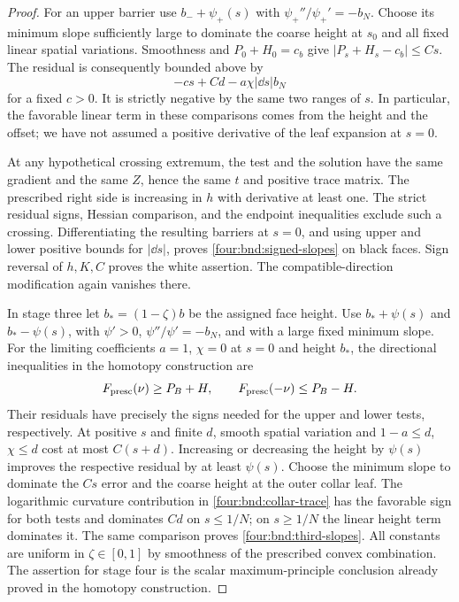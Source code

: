 \begin{proof}
For an upper barrier use $b_-+\psi_+(s)$ with
$\psi_+''/\psi_+'=-b_N$.  Choose its minimum slope sufficiently
large to dominate the coarse height at $s_0$ and all fixed linear
spatial variations.  Smoothness and $P_0+H_0=c_b$ give
$|P_s+H_s-c_b|\le Cs$.  The residual is consequently bounded above
by
\begin{equation}\label{four:bnd:upper-residual}
 -c s+Cd-a\chi|\dd s|b_N
\end{equation}
for a fixed $c>0$.  It is strictly negative by the same two ranges
of $s$.  In particular, the favorable linear term in these
comparisons comes from the height and the offset; we have not
assumed a positive derivative of the leaf expansion at $s=0$.

At any hypothetical crossing extremum, the test and the solution
have the same gradient and the same $Z$, hence the same $t$ and
positive trace matrix.  The prescribed right side is increasing
in $h$ with derivative at least one.  The strict residual signs,
Hessian comparison, and the endpoint inequalities exclude such
a crossing.  Differentiating the resulting barriers at $s=0$,
and using upper and lower positive bounds for $|\dd s|$, proves
\eqref{four:bnd:signed-slopes} on black faces.  Sign reversal of
$h,K,C$ proves the white assertion.  The compatible-direction
modification again vanishes there.

In stage three let $b_*=(1-\zeta)b$ be the assigned face height.
Use $b_*+\psi(s)$ and $b_*-\psi(s)$, with $\psi'>0$,
$\psi''/\psi'=-b_N$, and with a large fixed minimum slope.
For the limiting coefficients $a=1$, $\chi=0$ at $s=0$ and
height $b_*$, the directional
inequalities in the homotopy construction are
\[
 F_{\rm presc}(\nu)\ge P_B+H,\qquad
 F_{\rm presc}(-\nu)\le P_B-H.
\]
Their residuals have precisely the signs needed for the upper and
lower tests, respectively.  At positive $s$ and finite $d$, smooth
spatial variation and $1-a\le d$, $\chi\le d$ cost at most
$C(s+d)$.  Increasing or decreasing the height by $\psi(s)$
improves the respective residual by at least $\psi(s)$.  Choose
the minimum slope to dominate the $Cs$ error and the coarse height
at the outer collar leaf.  The logarithmic curvature contribution
in \eqref{four:bnd:collar-trace} has the favorable sign for both tests
and dominates $Cd$ on $s\le1/N$; on $s\ge1/N$ the linear height
term dominates it.  The same comparison proves
\eqref{four:bnd:third-slopes}.  All constants are uniform in
$\zeta\in[0,1]$ by smoothness of the prescribed convex combination.
The assertion for stage four is the scalar maximum-principle
conclusion already proved in the homotopy construction.
\end{proof}

